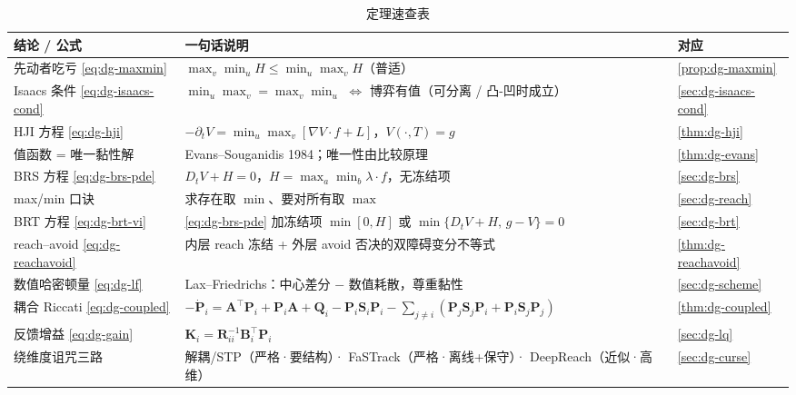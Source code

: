 \begin{table}[H]\centering\small
\caption{定理速查表}
\label{tab:dg-thm-cheat}
\begin{tabularx}{\linewidth}{lLl}
\toprule
结论 / 公式 & 一句话说明 & 对应 \\
\midrule
先动者吃亏 \cref{eq:dg-maxmin} & $\max_v\min_u H\le\min_u\max_v H$（普适） & \cref{prop:dg-maxmin} \\
Isaacs 条件 \cref{eq:dg-isaacs-cond} & $\min_u\max_v=\max_v\min_u$ $\iff$ 博弈有值（可分离 / 凸-凹时成立） & \cref{sec:dg-isaacs-cond} \\
HJI 方程 \cref{eq:dg-hji} & $-\partial_t V=\min_u\max_v[\nabla V\cdot f+L]$，$V(\cdot,T)=g$ & \cref{thm:dg-hji} \\
值函数 = 唯一黏性解 & Evans--Souganidis 1984；唯一性由比较原理 & \cref{thm:dg-evans} \\
BRS 方程 \cref{eq:dg-brs-pde} & $D_tV+H=0$，$H=\max_a\min_b\lambda\cdot f$，无冻结项 & \cref{sec:dg-brs} \\
max/min 口诀 & 求存在取 $\min$、要对所有取 $\max$ & \cref{sec:dg-reach} \\
BRT 方程 \cref{eq:dg-brt-vi} & \cref{eq:dg-brs-pde} 加冻结项 $\min[0,H]$ 或 $\min\{D_tV+H,\,g-V\}=0$ & \cref{sec:dg-brt} \\
reach--avoid \cref{eq:dg-reachavoid} & 内层 reach 冻结 + 外层 avoid 否决的双障碍变分不等式 & \cref{thm:dg-reachavoid} \\
数值哈密顿量 \cref{eq:dg-lf} & Lax--Friedrichs：中心差分 $-$ 数值耗散，尊重黏性 & \cref{sec:dg-scheme} \\
耦合 Riccati \cref{eq:dg-coupled} & $-\dot{\mathbf P}_i=\mathbf A^\top \mathbf P_i+\mathbf P_i\mathbf A+\mathbf Q_i-\mathbf P_i\mathbf S_i\mathbf P_i-\sum_{j\ne i}(\mathbf P_j\mathbf S_j\mathbf P_i+\mathbf P_i\mathbf S_j\mathbf P_j)$ & \cref{thm:dg-coupled} \\
反馈增益 \cref{eq:dg-gain} & $\mathbf K_i=\mathbf R_{ii}^{-1}\mathbf B_i^\top \mathbf P_i$ & \cref{sec:dg-lq} \\
绕维度诅咒三路 & 解耦/STP（严格·要结构）· FaSTrack（严格·离线+保守）· DeepReach（近似·高维） & \cref{sec:dg-curse} \\
\bottomrule
\end{tabularx}
\end{table}

